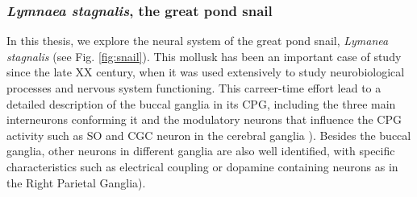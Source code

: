 \subsubsection{\textit{Lymnaea stagnalis}, the great pond snail}
In this thesis, we explore the neural system of the great pond snail, \textit{Lymanea stagnalis} (see Fig. \ref{fig:snail}). This mollusk has been an important case of study since the late XX century, when it was used extensively to study neurobiological processes and nervous system functioning. This carreer-time effort lead to a detailed description of the buccal ganglia 
in its CPG, including the three main interneurons conforming it \parencite{benjamin_snail_1989,benjamin_morphology_1979,rose_relationship_1979,brierley_behavioral_1997} and the modulatory neurons that influence the CPG activity such as SO and CGC neuron in the cerebral ganglia \parencite{rose_interneuronal_1981,mccrohan_patterns_1980,kemenes_multiple_2001}). Besides the buccal ganglia, other neurons in different ganglia are also well identified, with specific characteristics such as electrical coupling or dopamine containing neurons as in the Right Parietal Ganglia\parencite{benjamin_electrotonic_1986,winlow_multiple_1981}).

